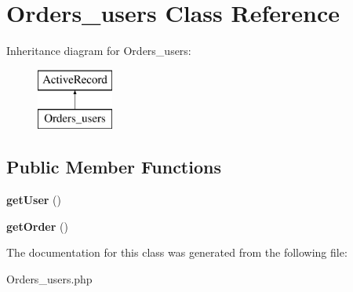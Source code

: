 \hypertarget{classapp_1_1models_1_1_orders__users}{}\section{Orders\+\_\+users Class Reference}
\label{classapp_1_1models_1_1_orders__users}
Inheritance diagram for Orders\+\_\+users\+:\begin{figure}[H]
\begin{center}
\leavevmode
\includegraphics[height=2.000000cm]{classapp_1_1models_1_1_orders__users}
\end{center}
\end{figure}
\subsection*{Public Member Functions}
\begin{DoxyCompactItemize}
\item 
\hypertarget{classapp_1_1models_1_1_orders__users_ae81b7186fb97a7c6457edcc68c9aa2ef}{}\label{classapp_1_1models_1_1_orders__users_ae81b7186fb97a7c6457edcc68c9aa2ef} 
{\bfseries get\+User} ()
\item 
\hypertarget{classapp_1_1models_1_1_orders__users_a52f1787c1a4941f65bf728ff3289b626}{}\label{classapp_1_1models_1_1_orders__users_a52f1787c1a4941f65bf728ff3289b626} 
{\bfseries get\+Order} ()
\end{DoxyCompactItemize}


The documentation for this class was generated from the following file\+:\begin{DoxyCompactItemize}
\item 
Orders\+\_\+users.\+php\end{DoxyCompactItemize}
